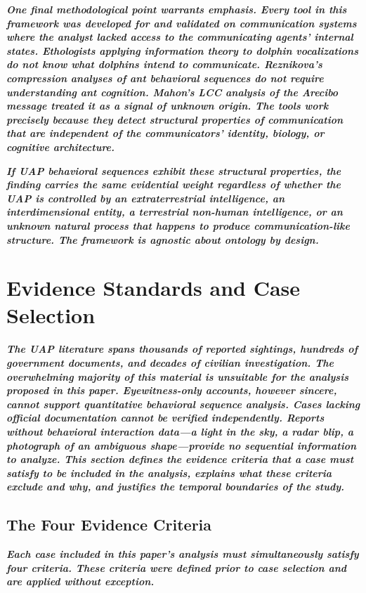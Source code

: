 \documentclass[11pt,letterpaper]{article}
\begin{document}
\textbf{\textit{One final methodological point warrants emphasis. Every tool in this framework was developed for and validated on communication systems where the analyst lacked access to the communicating agents' internal states. Ethologists applying information theory to dolphin vocalizations do not know what dolphins intend to communicate. Reznikova's compression analyses of ant behavioral sequences do not require understanding ant cognition. Mahon's LCC analysis of the Arecibo message treated it as a signal of unknown origin. The tools work precisely because they detect structural properties of communication that are independent of the communicators' identity, biology, or cognitive architecture.}}


\textbf{\textit{If UAP behavioral sequences exhibit these structural properties, the finding carries the same evidential weight regardless of whether the UAP is controlled by an extraterrestrial intelligence, an interdimensional entity, a terrestrial non-human intelligence, or an unknown natural process that happens to produce communication-like structure. The framework is agnostic about ontology by design.}}


\section{Evidence Standards and Case Selection}

\textbf{\textit{The UAP literature spans thousands of reported sightings, hundreds of government documents, and decades of civilian investigation. The overwhelming majority of this material is unsuitable for the analysis proposed in this paper. Eyewitness-only accounts, however sincere, cannot support quantitative behavioral sequence analysis. Cases lacking official documentation cannot be verified independently. Reports without behavioral interaction data---a light in the sky, a radar blip, a photograph of an ambiguous shape---provide no sequential information to analyze. This section defines the evidence criteria that a case must satisfy to be included in the analysis, explains what these criteria exclude and why, and justifies the temporal boundaries of the study.}}


\subsection{The Four Evidence Criteria}

\textbf{\textit{Each case included in this paper's analysis must simultaneously satisfy four criteria. These criteria were defined prior to case selection and are applied without exception.}}
\end{document}
